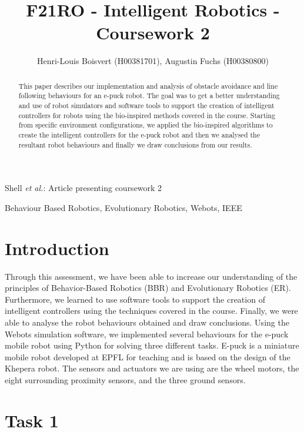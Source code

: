 \documentclass[lettersize,journal]{IEEEtran}
\begin{document}
\title{F21RO - Intelligent Robotics - Coursework 2}

\author{Henri-Louis Boisvert (H00381701), Augustin Fuchs (H00380800)}

%
{Shell \MakeLowercase{\textit{et al.}}: Article presenting coursework 2}

\maketitle

\begin{abstract}
This paper describes our implementation and analysis of obstacle avoidance and line following behaviours for an e-puck robot. The goal was to get a better understanding and use of robot simulators and software tools to support the creation of intelligent controllers for robots using the bio-inspired methods covered in the course. Starting from specific environment configurations, we applied the bio-inspired algorithms to create the intelligent controllers for the e-puck robot and then we analysed the resultant robot behaviours and finally we draw conclusions from our results.
\end{abstract}

\begin{IEEEkeywords}
Behaviour Based Robotics, Evolutionary Robotics, Webots, IEEE
\end{IEEEkeywords}

\section{Introduction}
Through this assessment, we have been able to increase our understanding of the principles of Behavior-Based Robotics (BBR) and Evolutionary Robotics (ER). Furthermore, we learned to use software tools to support the creation of intelligent controllers using the techniques covered in the course. Finally, we were able to analyse the robot behaviours obtained and draw conclusions. Using the Webots simulation software, we implemented several behaviours for the e-puck mobile robot using Python for solving three different tasks. E-puck is a miniature mobile robot developed at EPFL for teaching and is based on the design of the Khepera robot. The sensors and actuators we are using are the wheel motors, the eight surrounding proximity sensors, and the three ground sensors.
\section{Task 1}
\end{document}
